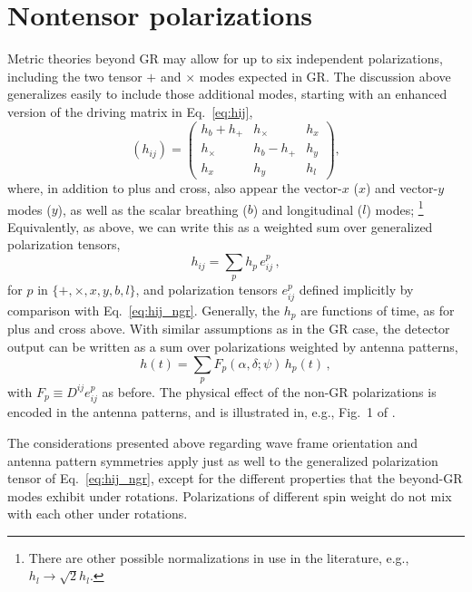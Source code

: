 \documentclass[aps,prd,twocolumn,superscriptaddress,preprintnumbers,floatfix,nofootinbib]{revtex4-2}
\newcommand{\beq}{\begin{equation}}
\newcommand{\eeq}{\end{equation}}
\newcommand*{\eq}[1]{Eq.~\eqref{eq:#1}}
\begin{document}
\section{Nontensor polarizations}
\label{sec:nongr}

\newcommand{\xsym}{\ensuremath{x}}
\newcommand{\ysym}{\ensuremath{y}}
\newcommand{\bsym}{\ensuremath{b}}
\newcommand{\lsym}{\ensuremath{l}}
\newcommand{\hx}{h_{\xsym}}
\newcommand{\hy}{h_{\ysym}}
\newcommand{\hb}{h_{\bsym}}
\newcommand{\hlon}{h_{\lsym}}

Metric theories beyond GR may allow for up to six independent polarizations, including the two tensor $+$ and $\times$ modes expected in GR.
The discussion above generalizes easily to include those additional modes, starting with an enhanced version of the driving matrix in Eq.~\eqref{eq:hij},
\beq \label{eq:hij_ngr}
(h_{ij}) = \begin{pmatrix}
\hb + h_+ & h_\times  & \hx  \\
h_\times  & \hb - h_+ & \hy  \\
\hx    & \hy    & \hlon
\end{pmatrix} ,
\eeq
where, in addition to plus and cross, also appear the vector-$x$ (\xsym) and vector-$y$ modes (\ysym), as well as the scalar breathing (\bsym) and longitudinal (\lsym) modes;%
\footnote{There are other possible normalizations in use in the literature, e.g., $\hlon \to \sqrt{2} \hlon$.}
Equivalently, as above, we can write this as a weighted sum over generalized polarization tensors,
\beq
h_{ij} = \sum_p h_p\, e^p_{ij} \, ,
\eeq
for $p$ in $\{+,\times, \xsym, \ysym, \bsym, \lsym\}$, and polarization tensors $e^p_{ij}$ defined implicitly by comparison with Eq.~\eqref{eq:hij_ngr}.
Generally, the $h_p$ are functions of time, as for plus and cross above.
%
With similar assumptions as in the GR case, the detector output can be written as a sum over polarizations weighted by antenna patterns,
\beq \label{eq:h_ngr}
h(t) = \sum_p F_p(\alpha, \delta; \psi)\, h_p(t)\, ,
\eeq
with $F_p \equiv D^{ij} e^p_{ij}$ as before. 
The physical effect of the non-GR polarizations is encoded in the antenna patterns, and is illustrated in, e.g., Fig.~1 of \cite{Isi:2017equ}.

The considerations presented above regarding wave frame orientation and antenna pattern symmetries apply just as well to the generalized polarization tensor of Eq.~\eqref{eq:hij_ngr}, except for the different properties that the beyond-GR modes exhibit under rotations.
Polarizations of different spin weight do not mix with each other under rotations.
\end{document}

